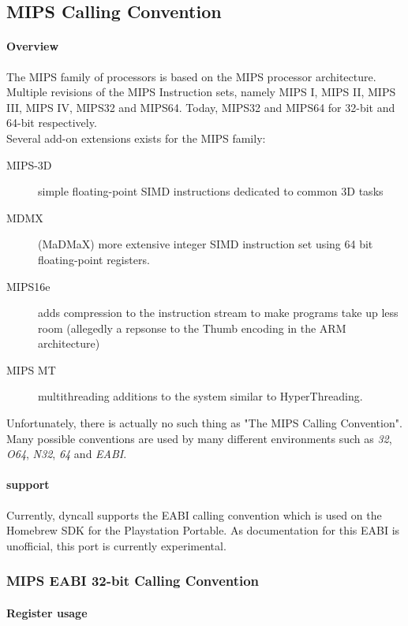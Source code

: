 \subsection{MIPS Calling Convention}

\paragraph{Overview}

The MIPS family of processors is based on the MIPS processor architecture.
Multiple revisions of the MIPS Instruction sets, namely MIPS I, MIPS II, MIPS III, MIPS IV, MIPS32 and MIPS64.
Today, MIPS32 and MIPS64 for 32-bit and 64-bit respectively.\\
Several add-on extensions exists for the MIPS family: 

\begin{description}
\item [MIPS-3D] simple floating-point SIMD instructions dedicated to common 3D tasks
\item [MDMX] (MaDMaX) more extensive integer SIMD instruction set using 64 bit floating-point registers.
\item [MIPS16e] adds compression to the instruction stream to make programs take up less room (allegedly a repsonse to the Thumb encoding in the ARM architecture)
\item [MIPS MT] multithreading additions to the system similar to HyperThreading.
\end{description}

Unfortunately, there is actually no such thing as "The MIPS Calling Convention".  Many possible conventions are used
by many different environments such as \emph{32}, \emph{O64}, \emph{N32}, \emph{64} and \emph{EABI}.

\paragraph{ support}

Currently, dyncall supports the EABI calling convention which is used on the Homebrew SDK for the Playstation Portable.
As documentation for this EABI is unofficial, this port is currently experimental.

\subsubsection{MIPS EABI 32-bit Calling Convention}

\paragraph{Register usage}

